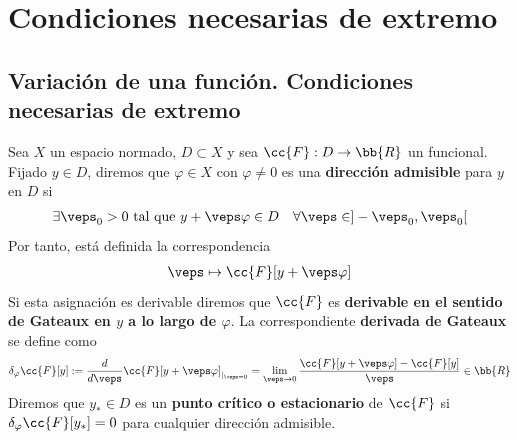 \chapter{Condiciones necesarias de extremo}

\section{Variación de una función. Condiciones necesarias de extremo}
\begin{definicion}
    Sea $X$ un espacio normado, $D\subset X$ y sea $\cc{F}:D \to \bb{R}$ un funcional. Fijado $y\in D$, diremos que $\varphi\in X$ con $\varphi\neq 0$ es una \textbf{dirección admisible} para $y$ en $D$ si 
    \begin{gather*}
        \exists\veps_0>0 \text{ tal que } y+\veps \varphi \in D\ \ \ \forall\veps \in ]-\veps_0, \veps_0[
    \end{gather*}
    Por tanto, está definida la correspondencia 
    \begin{gather*}
        \veps \mapsto \cc{F}[y+\veps\varphi]
    \end{gather*}
    Si esta asignación es derivable diremos que $\cc{F}$ es \textbf{derivable en el sentido de Gateaux en $y$ a lo largo de $\varphi$}. La correspondiente \textbf{derivada de Gateaux} se define como
    \begin{gather*}
        \delta_\varphi \cc{F}[y] := \frac{d}{d \veps} \cc{F}[y+\veps\varphi]_{|_{\veps=0}} = \lim_{\veps\to 0} \frac{\cc{F}[y+\veps\varphi] - \cc{F}[y]}{\veps} \in \bb{R}
    \end{gather*}
    Diremos que $y_*\in D$ es un \textbf{punto crítico o estacionario} de $\cc{F}$ si $\delta_\varphi \cc{F}[y_*] = 0$ para cualquier dirección admisible.
\end{definicion}

